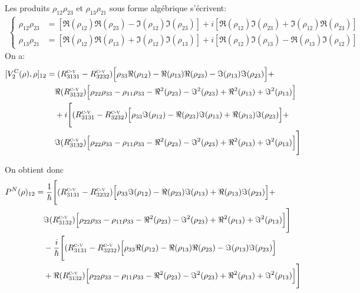 \documentclass[12pt,a4paper,openany,oneside]{book}
\begin{document}
{{{{{{Les produits $\rho_{12}\rho_{23}$ et $\rho_{13}\rho_{21}$ sous forme algébrique s'écrivent:
\begin{eqnarray*}
\left\{
\begin{split}
\rho_{12}\rho_{23} &= [ \Re(\rho_{12})\Re(\rho_{23})-\Im(\rho_{12})\Im(\rho_{23})] + i[\Re(\rho_{12})    
                          \Im(\rho_{23})+\Im(\rho_{12})\Re(\rho_{23})]\\
\rho_{13}\rho_{21} &= [ \Re(\rho_{12})\Re(\rho_{13})+\Im(\rho_{12})\Im(\rho_{13})] + i[\Re(\rho_{12})\Im(\rho_{13})-\Re(\rho_{13})\Im(\rho_{12})] 
\end{split}
\right.                              
\end{eqnarray*}
On a:
\begin{eqnarray*}
\begin{split}
[V_{2}^{\textrm{C}}(\rho),\rho]_{12}&= (R^{\textsc{c-v}}_{3131}-R^{\textsc{c-v}}_{3232})\Big[\rho_{33}\Re(\rho_{12})-\Re(\rho_{13})\Re(\rho_{23})-\Im(\rho_{13})\Im(\rho_{23})\Big] +  \\
&\quad \Re(R^{\textsc{c-v}}_{3132})\Big[\rho_{22}\rho_{33}-\rho_{11}\rho_{33}-\Re^{2}(\rho_{23})-\Im^{2}(\rho_{23})+\Re^{2}(\rho_{13})+\Im^{2}(\rho_{13})\Big]\\
&\quad +i\Bigg[ (R^{\textsc{c-v}}_{3131}-R^{\textsc{c-v}}_{3232})\Big[\rho_{33}\Im(\rho_{12})-\Re(\rho_{23})\Im(\rho_{13})+\Re(\rho_{13})\Im(\rho_{23})\Big] + \\
&\quad \Im(R^{\textsc{c-v}}_{3132})\Big[\rho_{22}\rho_{33}-\rho_{11}\rho_{33}-\Re^{2}(\rho_{23})-\Im^{2}(\rho_{23})+\Re^{2}(\rho_{13})+\Im^{2}(\rho_{13})\Big]\Bigg]
\end{split}
\end{eqnarray*}

On obtient donc 
\begin{eqnarray*}
\begin{split}
P^{N}(\rho)_{12} &=\dfrac{1}{\hbar}\Bigg[ (R^{\textsc{c-v}}_{3131}-R^{\textsc{c-v}}_{3232})\Big[\rho_{33}\Im(\rho_{12})-\Re(\rho_{23})\Im(\rho_{13})+\Re(\rho_{13})\Im(\rho_{23})\Big] + \\
&\quad \Im(R^{\textsc{c-v}}_{3132})\Big[\rho_{22}\rho_{33}-\rho_{11}\rho_{33}-\Re^{2}(\rho_{23})-\Im^{2}(\rho_{23})+\Re^{2}(\rho_{13})+\Im^{2}(\rho_{13})\Big]\Bigg]\\
&\quad -\dfrac{i}{\hbar}\Bigg[(R^{\textsc{c-v}}_{3131}-R^{\textsc{c-v}}_{3232})\Big[\rho_{33}\Re(\rho_{12})-\Re(\rho_{13})\Re(\rho_{23})-\Im(\rho_{13})\Im(\rho_{23})\Big]\\ 
&\quad + \Re(R^{\textsc{c-v}}_{3132})\Big[\rho_{22}\rho_{33}-\rho_{11}\rho_{33}-\Re^{2}(\rho_{23})-\Im^{2}(\rho_{23})+\Re^{2}(\rho_{13})+\Im^{2}(\rho_{13})\Big]\Bigg]
\end{split}
\end{eqnarray*}

}}}}}}
\end{document}
